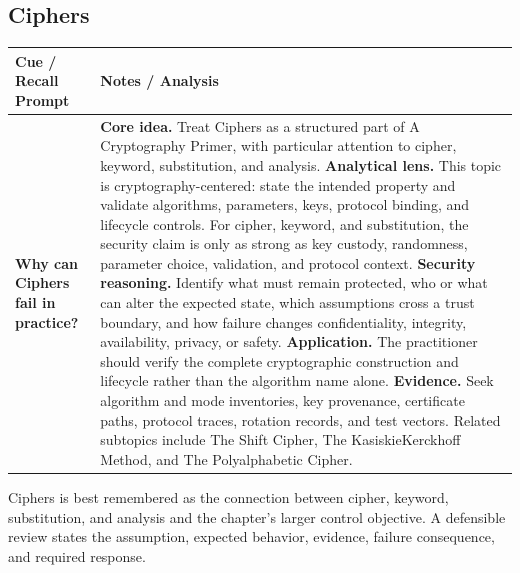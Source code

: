 \documentclass[11pt]{article}
\newcommand{\CornellHeader}{%
\rowcolor{Navy}\color{white}\bfseries Cue / Recall Prompt & \color{white}\bfseries Notes / Analysis\\\hline}
\newcommand{\CornellRow}[2]{%
\cellcolor{CueGray}\RaggedRight\textbf{#1} & \RaggedRight #2\\\hline}
\begin{document}
\subsection*{Ciphers}
\begin{longtable}{>{\RaggedRight\arraybackslash}p{}|>{\RaggedRight\arraybackslash}p{}}
\CornellHeader
\CornellRow{Why can Ciphers fail in practice?}{\textbf{Core idea.} Treat Ciphers as a structured part of A Cryptography Primer, with particular attention to cipher, keyword, substitution, and analysis. \textbf{Analytical lens.} This topic is cryptography-centered: state the intended property and validate algorithms, parameters, keys, protocol binding, and lifecycle controls. For cipher, keyword, and substitution, the security claim is only as strong as key custody, randomness, parameter choice, validation, and protocol context. \textbf{Security reasoning.} Identify what must remain protected, who or what can alter the expected state, which assumptions cross a trust boundary, and how failure changes confidentiality, integrity, availability, privacy, or safety. \textbf{Application.} The practitioner should verify the complete cryptographic construction and lifecycle rather than the algorithm name alone. \textbf{Evidence.} Seek algorithm and mode inventories, key provenance, certificate paths, protocol traces, rotation records, and test vectors. Related subtopics include The Shift Cipher, The KasiskieKerckhoff Method, and The Polyalphabetic Cipher.}
\end{longtable}
\begin{topicsummary}
Ciphers is best remembered as the connection between cipher, keyword, substitution, and analysis and the chapter's larger control objective. A defensible review states the assumption, expected behavior, evidence, failure consequence, and required response.
\end{topicsummary}
\end{document}
